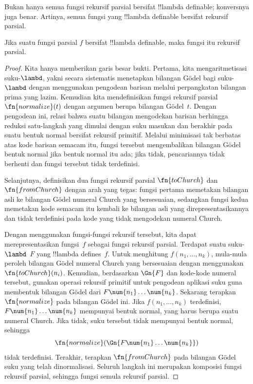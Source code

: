 \documentclass[../../../include/open-logic-section]{subfiles}
\begin{document}

Bukan hanya semua fungsi rekursif parsial bersifat !!{lambda definable};
konversnya juga benar. Artinya, semua fungsi yang !!{lambda definable}
bersifat rekursif parsial.

\begin{thm}
   Jika suatu fungsi parsial $f$ bersifat
  !!{lambda definable}, maka fungsi itu rekursif parsial.
\end{thm}

\begin{proof}
  Kita hanya memberikan garis besar bukti. Pertama, kita mengaritmetisasi
  suku-$\lambd$, yakni secara sistematis menetapkan bilangan G\"odel bagi
  suku-$\lambd$ dengan menggunakan pengodean barisan melalui perpangkatan
  bilangan prima yang lazim. Kemudian kita mendefinisikan fungsi rekursif
  parsial $\fn{normalize}(t)$ dengan argumen berupa bilangan G\"odel~$t$.
  Dengan pengodean ini, relasi bahwa suatu bilangan mengodekan barisan
  berhingga reduksi satu-langkah yang dimulai dengan suku masukan dan
  berakhir pada suatu bentuk normal bersifat rekursif primitif. Melalui
  minimisasi tak berbatas atas kode barisan semacam itu, fungsi tersebut
  mengembalikan bilangan G\"odel bentuk normal jika bentuk normal itu ada;
  jika tidak, pencariannya tidak berhenti dan fungsi tersebut tidak
  terdefinisi.

  Selanjutnya, definisikan dua fungsi rekursif parsial
  $\fn{toChurch}$ dan $\fn{fromChurch}$ dengan arah yang tegas: fungsi pertama
  memetakan bilangan asli ke bilangan G\"odel numeral Church yang
  bersesuaian, sedangkan fungsi kedua memetakan kode semacam itu kembali ke
  bilangan asli yang direpresentasikannya dan tidak terdefinisi pada kode yang
  tidak mengodekan numeral Church.

  Dengan menggunakan fungsi-fungsi rekursif tersebut, kita dapat
  merepresentasikan fungsi~$f$ sebagai fungsi rekursif parsial. Terdapat suatu
  suku-$\lambd$~$F$ yang !!{lambda define}s~$f$. Untuk menghitung
  $f(n_1, \dots, n_k)$, mula-mula peroleh bilangan G\"odel numeral Church yang
  bersesuaian dengan menggunakan $\fn{toChurch}(n_i)$. Kemudian, berdasarkan
  $\Gn{F}$ dan kode-kode numeral tersebut, gunakan operasi rekursif primitif
  untuk pengodean aplikasi suku guna membentuk bilangan G\"odel dari
  $F \num{n_1}\dots\num{n_k}$. Sekarang terapkan $\fn{normalize}$ pada bilangan
  G\"odel ini. Jika $f(n_1, \dots, n_k)$ terdefinisi,
  $F \num{n_1}\dots\num{n_k}$ mempunyai bentuk normal, yang harus berupa suatu
  numeral Church. Jika tidak, suku tersebut tidak mempunyai bentuk normal,
  sehingga
  \[\fn{normalize}(\Gn{F\num{n_1}\dots\num{n_k}})\]
  tidak terdefinisi. Terakhir, terapkan $\fn{fromChurch}$ pada bilangan
  G\"odel suku yang telah dinormalisasi. Seluruh langkah ini merupakan
  komposisi fungsi rekursif parsial, sehingga fungsi semula rekursif parsial.
\end{proof}
\end{document}
